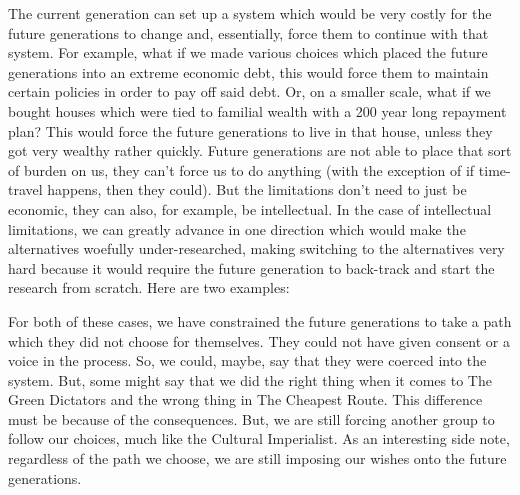 The current generation can set up a system which would be very costly for the future generations to change and, essentially, force them to continue with that system. For example, what if we made various choices which placed the future generations into an extreme economic debt, this would force them to maintain certain policies in order to pay off said debt. Or, on a smaller scale, what if we bought houses which were tied to familial wealth with a 200 year long repayment plan? This would force the future generations to live in that house, unless they got very wealthy rather quickly. Future generations are not able to place that sort of burden on us, they can't force us to do anything (with the exception of if time-travel happens, then they could). But the limitations don't need to just be economic, they can also, for example, be intellectual. In the case of intellectual limitations, we can greatly advance in one direction which would make the alternatives woefully under-researched, making switching to the alternatives very hard because it would require the future generation to back-track and start the research from scratch. Here are two examples: 



For both of these cases, we have constrained the future generations to take a path which they did not choose for themselves. They could not have given consent or a voice in the process. So, we could, maybe, say that they were coerced into the system. But, some might say that we did the right thing when it comes to The Green Dictators and the wrong thing in The Cheapest Route. This difference must be because of the consequences. But, we are still forcing another group to follow our choices, much like the Cultural Imperialist. As an interesting side note, regardless of the path we choose, we are still imposing our wishes onto the future generations.
